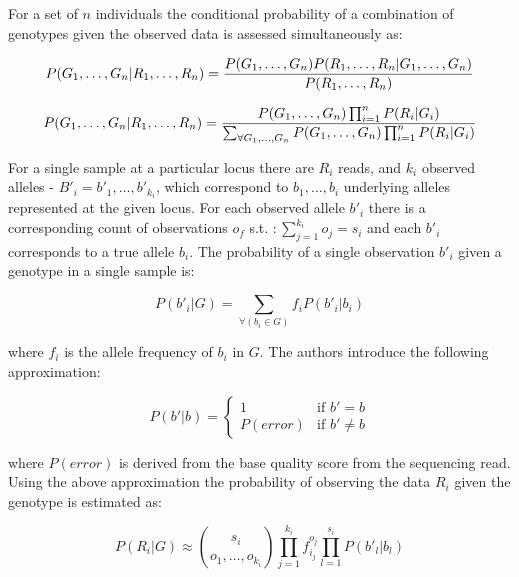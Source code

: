 For a set of $n$ individuals the conditional probability of a combination of genotypes given the observed data is assessed simultaneously as:

\begin{equation}
P(G_1,\ldots,G_n|R_1,\ldots,R_n) 
= { P(G_1,\ldots,G_n) P(R_1,\ldots,R_n|G_1,\ldots,G_n) \over P(R_1,\ldots,R_n)} \\
\end{equation}

\begin{equation}
\label{eq:freebayes_main_model}
P(G_1,\ldots,G_n|R_1,\ldots,R_n) = { P(G_1,\ldots,G_n) \prod_{i=1}^n P(R_i|G_i) \over 
\sum_{\forall{G_1,\ldots,G_n}}  P(G_1,\ldots,G_n) \prod_{i=1}^n P(R_i|G_i) }
\end{equation}
    
For a single sample at a particular locus there are $R_i$ reads, and $k_i$ observed alleles - $B'_i = b'_1,\ldots,b'_{k_i}$, which correspond to $b_1,\ldots,b_i$ underlying alleles represented at the given locus. For each observed allele $b'_i$ there is a corresponding count of observations $o_f$ s.t. $: \sum_{j=1}^{k_i} o_j = s_i$ and each $b'_i$ corresponds to a true allele $b_i$. The probability of a single observation $b'_i$ given a genotype in a single sample is:

\begin{equation}
\label{eq:freebayes_data_given_g}
P(b'_i|G) = \sum_{\forall(b_i \in G)} { f_i P(b'_i|b_i) }
\end{equation}

where $f_i$ is the allele frequency of $b_i$ in $G$. The authors introduce the following approximation:


\begin{equation}
\label{eq:freebayes_obs_given_base}
P(b'|b) = 
\left\{
        \begin{array}{ll}
                1 & \mbox{if } b' = b \\
                P(error) & \mbox{if } b' \neq b
        \end{array}
\right.
\end{equation}

where $P(error)$ is derived from the base quality score from the sequencing read. Using the above approximation the probability of observing the data $R_i$ given the genotype is estimated as:

\begin{equation}
P(R_i|G) \approx {s_i \choose o_1,\ldots,o_{k_i} } 
\prod_{j=1}^{k_i} { f_{i_j}^{o_j} }
\prod_{l=1}^{s_i} { P(b'_l | b_l) }
\end{equation}

